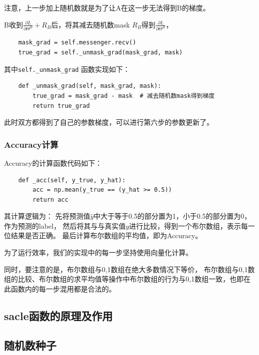 \documentclass[twoside,11pt]{article}
\begin{document}
注意，上一步加上随机数就是为了让A在这一步无法得到B的梯度。

B收到$\frac{\partial L}{\partial \Theta^B}+R_B$后，将其减去随机数mask $R_B$得到$\frac{\partial L}{\partial \Theta^B}$，
\begin{lstlisting}
    mask_grad = self.messenger.recv()
    true_grad = self._unmask_grad(mask_grad, mask)
\end{lstlisting}

其中\verb |self._unmask_grad| 函数实现如下：
\begin{lstlisting}
    def _unmask_grad(self, mask_grad, mask):
        true_grad = mask_grad - mask  # 减去随机数mask得到梯度
        return true_grad
\end{lstlisting}

此时双方都得到了自己的参数梯度，可以进行第六步的参数更新了。

\subsubsection{Accuracy计算}
Accuracy的计算函数代码如下：
\begin{lstlisting}
    def _acc(self, y_true, y_hat):
        acc = np.mean(y_true == (y_hat >= 0.5))
        return acc
\end{lstlisting}

其计算逻辑为：
先将预测值$\hat{y}$中大于等于0.5的部分置为1，小于0.5的部分置为0，作为预测的label，
然后将其与与真实值$y$进行比较，得到一个布尔数组，表示每一位结果是否正确。
最后计算布尔数组的平均值，即为Accuracy。

为了运行效率，我们的实现中的每一步坚持使用向量化计算。

同时，要注意的是，布尔数组与0,1数组在绝大多数情况下等价，
布尔数组与0,1数组的比较、布尔数组的求平均值等操作中布尔数组的行为与0,1数组一致，也即在此函数内的每一步混用都是合法的。



\subsection{sacle函数的原理及作用}



\subsection{随机数种子}
\end{document}
